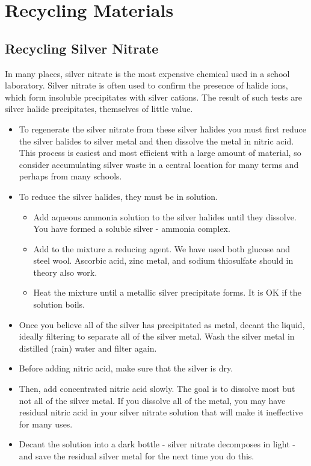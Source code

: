 \chapter{Recycling Materials} 

\section{Recycling Silver Nitrate} 
\label{cha:recyclesilver}
In many places, 
silver nitrate is the most expensive chemical 
used in a school laboratory. 
Silver nitrate is often used to confirm the presence of halide ions, 
which form insoluble precipitates with silver cations. 
The result of such tests are silver halide precipitates, 
themselves of little value.

\begin{itemize}
\item To regenerate the silver nitrate from these silver halides 
you must first reduce the silver halides to silver metal 
and then dissolve the metal in nitric acid. 
This process is easiest and most efficient 
with a large amount of material, 
so consider accumulating silver waste in a central location 
for many terms and perhaps from many schools.


\item To reduce the silver halides, 
they must be in solution. 
\begin{itemize}
\item Add aqueous ammonia solution to the silver halides until they dissolve. 
You have formed a soluble silver - ammonia complex. 
\item Add to the mixture a reducing agent. 
We have used both glucose and steel wool. 
Ascorbic acid, 
zinc metal, 
and sodium thiosulfate should in theory also work. 
\item Heat the mixture until a metallic silver precipitate forms. 
It is OK if the solution boils.
\end{itemize}

\item Once you believe all of the silver has precipitated as metal, 
decant the liquid, 
ideally filtering to separate all of the silver metal. 
Wash the silver metal in distilled (rain) water and filter again.

\item Before adding nitric acid, 
make sure that the silver is dry. 
\item Then, 
add concentrated nitric acid slowly. 
The goal is to dissolve most but not all of the silver metal. 
If you dissolve all of the metal, 
you may have residual nitric acid in your silver nitrate solution 
that will make it ineffective for many uses. 
\item Decant the solution into a dark bottle - 
silver nitrate decomposes in light - 
and save the residual silver metal for the next time you do this.
\end{itemize}


